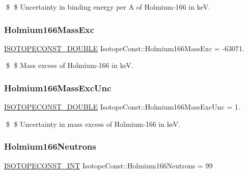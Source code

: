 \$ \$ Uncertainty in binding energy per A of Holmium-\/166 in keV. \mbox{\label{group___isotope_const-_holmium-_ho166_ga3f734cde5fe1719bf793d64555aefdb5}} 
\subsubsection{\texorpdfstring{Holmium166\+Mass\+Exc}{Holmium166MassExc}}
{\footnotesize\ttfamily \mbox{\hyperlink{group___isotope_const-_macros_ga8f45a7272ce02c0b4c65c44636ed719a}{I\+S\+O\+T\+O\+P\+E\+C\+O\+N\+S\+T\+\_\+\+D\+O\+U\+B\+LE}} Isotope\+Const\+::\+Holmium166\+Mass\+Exc = -\/63071.}

\$ \$ Mass excess of Holmium-\/166 in keV. \mbox{\label{group___isotope_const-_holmium-_ho166_gaddeb0cbd067852f6a304f5289a42dfcb}} 
\subsubsection{\texorpdfstring{Holmium166\+Mass\+Exc\+Unc}{Holmium166MassExcUnc}}
{\footnotesize\ttfamily \mbox{\hyperlink{group___isotope_const-_macros_ga8f45a7272ce02c0b4c65c44636ed719a}{I\+S\+O\+T\+O\+P\+E\+C\+O\+N\+S\+T\+\_\+\+D\+O\+U\+B\+LE}} Isotope\+Const\+::\+Holmium166\+Mass\+Exc\+Unc = 1.}

\$ \$ Uncertainty in mass excess of Holmium-\/166 in keV. \mbox{\label{group___isotope_const-_holmium-_ho166_ga9c826dac5aa63babb8c9dfc76cdf0f2e}} 
\subsubsection{\texorpdfstring{Holmium166\+Neutrons}{Holmium166Neutrons}}
{\footnotesize\ttfamily \mbox{\hyperlink{group___isotope_const-_macros_ga5f18360b3e99483a35c32d789e62621c}{I\+S\+O\+T\+O\+P\+E\+C\+O\+N\+S\+T\+\_\+\+I\+NT}} Isotope\+Const\+::\+Holmium166\+Neutrons = 99}

